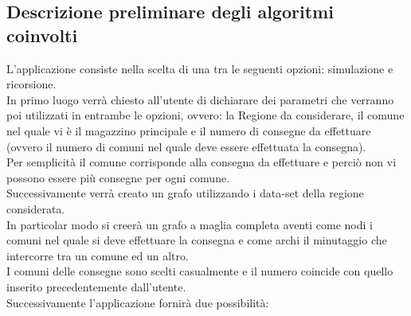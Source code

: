 \documentclass[a4paper,12pt]{report}
\begin{document}
\subsection*{Descrizione preliminare degli algoritmi coinvolti}
L'applicazione consiste nella scelta di una tra le seguenti opzioni: simulazione e ricorsione.\\
In primo luogo verrà chiesto all'utente di dichiarare dei parametri che verranno poi utilizzati in entrambe le opzioni, ovvero: la Regione da considerare, il comune nel quale vi è il magazzino principale e il numero di consegne da effettuare (ovvero il numero di comuni nel quale deve essere effettuata la consegna).\\
Per semplicità il comune corrisponde alla consegna da effettuare e perciò non vi possono essere più consegne per ogni comune.\\
Successivamente verrà creato un grafo utilizzando i data-set della regione considerata.\\
In particolar modo si creerà un grafo a maglia completa aventi come nodi i comuni nel quale si deve effettuare la consegna e come archi il minutaggio che intercorre tra un comune ed un altro.\\
I comuni delle consegne sono scelti casualmente e il numero coincide con quello inserito precedentemente dall'utente.\\
Successivamente l'applicazione fornirà due possibilità:
\end{document}
